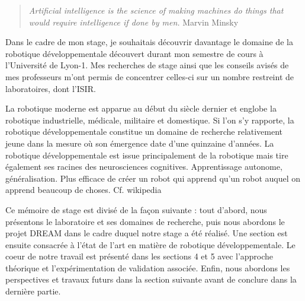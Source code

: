 \documentclass{llncs}
\begin{document}





 \begin{quotation}
  \textit{Artificial intelligence is the science of making machines do things that would require intelligence if done by men.} Marvin Minsky
 \end{quotation}

 
Dans le cadre de mon stage, je souhaitais découvrir davantage le domaine de la robotique développementale découvert durant mon semestre de cours à l'Université de Lyon-1. Mes recherches de stage ainsi que les conseils avisés de mes professeurs m'ont permis de concentrer celles-ci sur un nombre restreint de laboratoires, dont l'ISIR.

La robotique moderne est apparue au début du siècle dernier et englobe la robotique industrielle, médicale, militaire et domestique. Si l'on s'y rapporte, la robotique développementale constitue un domaine de recherche relativement jeune dans la mesure où son émergence date d'une quinzaine d'années. La robotique développementale est issue principalement de la robotique mais tire également ses racines des neurosciences cognitives.
Apprentissage autonome, généralisation.
Plus efficace de créer un robot qui apprend qu'un robot auquel on apprend beaucoup de choses.
Cf. wikipedia

Ce mémoire de stage est divisé de la façon suivante : tout d'abord, nous présentons le laboratoire et ses domaines de recherche, puis nous abordons le projet DREAM dans le cadre duquel notre stage a été réalisé. Une section est ensuite consacrée à l'état de l'art en matière de robotique développementale. Le coeur de notre travail est présenté dans les sections 4 et 5 avec l'approche théorique et l'expérimentation de validation associée.  Enfin, nous abordons les perspectives et travaux futurs dans la section suivante avant de conclure dans la dernière partie.
\end{document}
